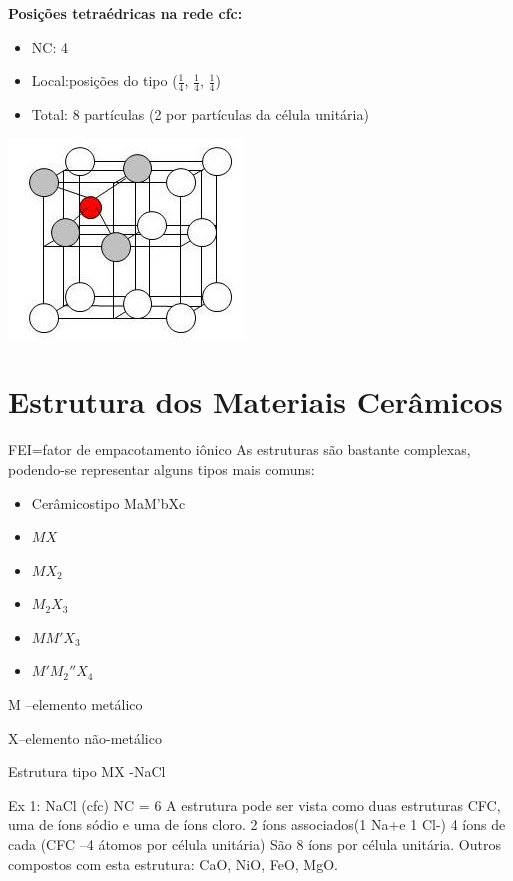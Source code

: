  
\textbf{ Posições tetraédricas na rede cfc:}

  \begin{itemize}
 	
 	\setlength{\parskip}{0pt}
 	\setlength{\itemsep}{0pt plus 1pt}
 	
 	\item NC: 4
 	\item Local:posições do tipo ($\frac{1}{4}$, $\frac{1}{4}$, $\frac{1}{4}$)
 	\item Total: 8 partículas (2 por partículas	da célula unitária)
 \end{itemize}

 \includegraphics[scale=0.5,trim={0 0 0 0}]{figures/tetcfc}
 
\section{Estrutura dos Materiais Cerâmicos}
FEI=fator de empacotamento iônico
As estruturas são bastante complexas, podendo-se representar alguns tipos mais comuns:


\begin{itemize}
	\item Cerâmicostipo MaM’bXc
	\item $MX$
	\item $MX_{2}$
	\item $M_{2}X_{3}$
	\item $MM'X_{3}$
	\item $M'M_{2}''X_{4}$
\end{itemize}

M –elemento metálico

X–elemento não-metálico



Estrutura tipo MX -NaCl

Ex 1: NaCl (cfc)
NC = 6
A estrutura pode ser vista como duas estruturas CFC, uma de íons sódio e uma de íons cloro.
2 íons associados(1 Na+e 1 Cl-)
4 íons de cada (CFC –4 átomos por célula unitária)
São 8 íons por célula unitária.
Outros compostos com esta estrutura: CaO, NiO, FeO, MgO.

